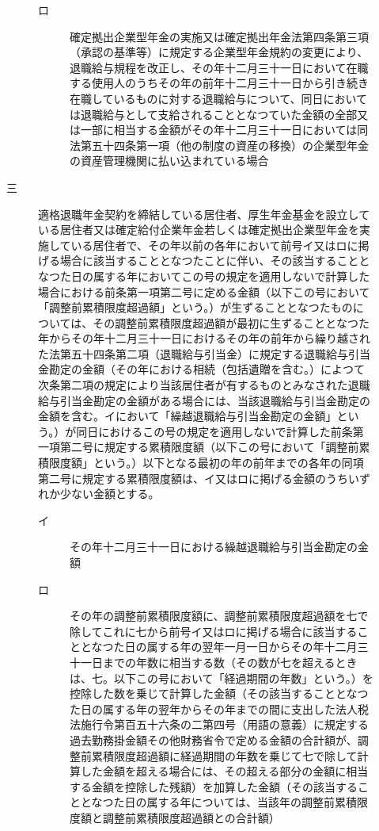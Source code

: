 \documentclass[twocolumn,a4j,10pt]{ltjtarticle}
\begin{document}
\begin{description}
\begin{description}
\begin{description}
\item[ロ]確定拠出企業型年金の実施又は確定拠出年金法第四条第三項（承認の基準等）に規定する企業型年金規約の変更により、退職給与規程を改正し、その年十二月三十一日において在職する使用人のうちその年の前年十二月三十一日から引き続き在職しているものに対する退職給与について、同日においては退職給与として支給されることとなつていた金額の全部又は一部に相当する金額がその年十二月三十一日においては同法第五十四条第一項（他の制度の資産の移換）の企業型年金の資産管理機関に払い込まれている場合
\end{description}
\item[三]適格退職年金契約を締結している居住者、厚生年金基金を設立している居住者又は確定給付企業年金若しくは確定拠出企業型年金を実施している居住者で、その年以前の各年において前号イ又はロに掲げる場合に該当することとなつたことに伴い、その該当することとなつた日の属する年においてこの号の規定を適用しないで計算した場合における前条第一項第二号に定める金額（以下この号において「調整前累積限度超過額」という。）が生ずることとなつたものについては、その調整前累積限度超過額が最初に生ずることとなつた年からその年十二月三十一日におけるその年の前年から繰り越された法第五十四条第二項（退職給与引当金）に規定する退職給与引当金勘定の金額（その年における相続（包括遺贈を含む。）によつて次条第二項の規定により当該居住者が有するものとみなされた退職給与引当金勘定の金額がある場合には、当該退職給与引当金勘定の金額を含む。イにおいて「繰越退職給与引当金勘定の金額」という。）が同日におけるこの号の規定を適用しないで計算した前条第一項第二号に規定する累積限度額（以下この号において「調整前累積限度額」という。）以下となる最初の年の前年までの各年の同項第二号に規定する累積限度額は、イ又はロに掲げる金額のうちいずれか少ない金額とする。
\begin{description}
\item[イ]その年十二月三十一日における繰越退職給与引当金勘定の金額
\item[ロ]その年の調整前累積限度額に、調整前累積限度超過額を七で除してこれに七から前号イ又はロに掲げる場合に該当することとなつた日の属する年の翌年一月一日からその年十二月三十一日までの年数に相当する数（その数が七を超えるときは、七。以下この号において「経過期間の年数」という。）を控除した数を乗じて計算した金額（その該当することとなつた日の属する年の翌年からその年までの間に支出した法人税法施行令第百五十六条の二第四号（用語の意義）に規定する過去勤務掛金額その他財務省令で定める金額の合計額が、調整前累積限度超過額に経過期間の年数を乗じて七で除して計算した金額を超える場合には、その超える部分の金額に相当する金額を控除した残額）を加算した金額（その該当することとなつた日の属する年については、当該年の調整前累積限度額と調整前累積限度超過額との合計額）
\end{description}
\end{description}
\end{description}
\end{document}

